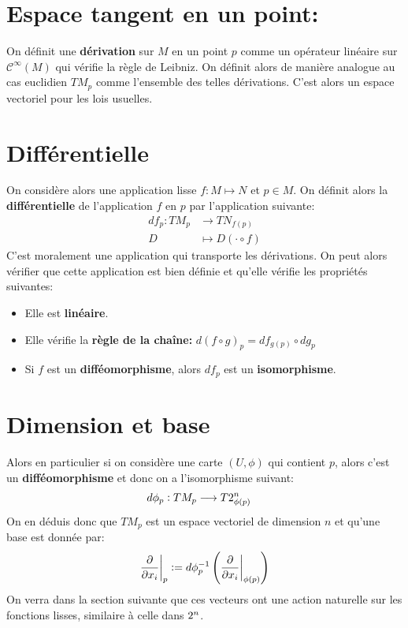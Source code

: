    \section{Espace tangent en un point:}
      On définit une \textbf{dérivation} sur \( M \) en un point \( p \) comme un opérateur linéaire sur \( \mathcal{C}^\infty(M) \) qui vérifie la règle de Leibniz. On définit alors de manière analogue au cas euclidien \( TM_p \) comme l'ensemble des telles dérivations. C'est alors un espace vectoriel pour les lois usuelles.
   \section{Différentielle}
      On considère alors une application lisse \( f : M \longmapsto N \) et \( p \in M \). On définit alors la \textbf{différentielle} de l'application \( f \) en \( p \) par l'application suivante:
      \[ 
         \begin{aligned}
            df_p : TM_p &\longrightarrow TN_{f(p)} \\
            D &\longmapsto D(\cdot \circ f)
         \end{aligned} 
      \]
      C'est moralement une application qui transporte les dérivations. On peut alors vérifier que cette application est bien définie et qu'elle vérifie les propriétés suivantes:
      \begin{itemize}
         \item Elle est \textbf{linéaire}.
         \item Elle vérifie la \textbf{règle de la chaîne:} \( d(f \circ g)_p = df_{g(p)} \circ dg_p \)
         \item Si \( f \) est un \textbf{difféomorphisme}, alors \( df_p \) est un \textbf{isomorphisme}.
      \end{itemize}
   \section{Dimension et base}
   Alors en particulier si on considère une carte \( (U, \phi) \) qui contient \( p \), alors c'est un \textbf{difféomorphisme} et donc on a l'isomorphisme suivant:
      \[ 
         \begin{aligned}
            d\phi_p : TM_p &\longrightarrow T2_{\phi(p)}^n
         \end{aligned} 
      \]
      On en déduis donc que \( TM_p \) est un espace vectoriel de dimension \( n \) et qu'une base  est donnée par:
      \[ 
         \frac{\partial }{\partial x_i}\biggr|_p := d\phi_{p}^{-1}\left( \frac{\partial }{\partial x_i}\biggr|_{\phi(p)}\right) 
      \]
      On verra dans la section suivante que ces vecteurs ont une action naturelle sur les fonctions lisses, similaire à celle dans \( 2^n \).
   \pagebreak

